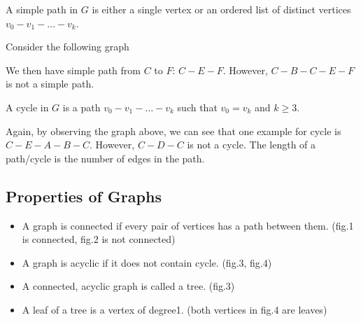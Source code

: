 \begin{definition}
  A simple path in \(G\) is either a single vertex or an ordered list of distinct vertices \(v_0 - v_1 - \dots - v_k\).
\end{definition}
Consider the following graph
\begin{figure}[H]
  \centering
\end{figure}
We then have simple path from \(C\) to \(F\): \(C - E - F\). However, \(C - B - C - E - F\) is not a simple path. 

\begin{definition}[Cycles]
  A cycle in \(G\) is a path \(v_0 - v_1 - \dots - v_k\) such that \(v_0 = v_k\) and \(k \geq 3\). 
\end{definition}
Again, by observing the graph above, we can see that one example for cycle is \(C - E - A - B - C\). However, \(C - D - C\) is not a cycle. 
The length of a path/cycle is the number of edges in the path. 

\subsection{Properties of Graphs}
\begin{itemize}
  \item A graph is connected if every pair of vertices has a path between them. (fig.1 is connected, fig.2 is not connected)
  \item A graph is acyclic if it does not contain cycle. (fig.3, fig.4)
  \item A connected, acyclic graph is called a tree. (fig.3)
  \item A leaf of a tree is a vertex of degree1. (both vertices in fig.4 are leaves)
\end{itemize}

